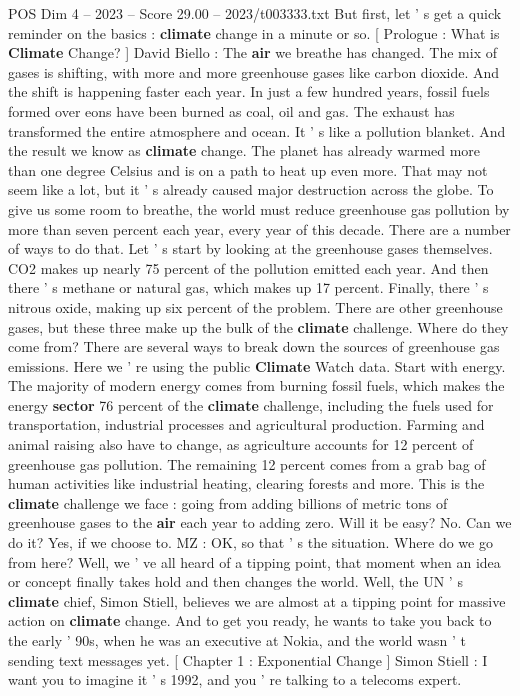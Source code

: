 \begin{textsample}{POS Dim 4 – 2023 – Score 29.00 – 2023/t003333.txt}
But first, let ' s get a quick reminder on the basics : \textbf{climate} change in a minute or so. [ Prologue : What is \textbf{Climate} Change? ] David Biello : The \textbf{air} we breathe has changed.
The mix of gases is shifting, with more and more greenhouse gases like carbon dioxide.
And the shift is happening faster each year.
In just a few hundred years, fossil fuels formed over eons have been burned as coal, oil and gas.
The exhaust has transformed the entire atmosphere and ocean.
It ' s like a pollution blanket.
And the result we know as \textbf{climate} change.
The planet has already warmed more than one degree Celsius and is on a path to heat up even more.
That may not seem like a lot, but it ' s already caused major destruction across the globe.
To give us some room to breathe, the world must reduce greenhouse gas pollution by more than seven percent each year, every year of this decade.
There are a number of ways to do that.
Let ' s start by looking at the greenhouse gases themselves.
CO2 makes up nearly 75 percent of the pollution emitted each year.
And then there ' s methane or natural gas, which makes up 17 percent.
Finally, there ' s nitrous oxide, making up six percent of the problem.
There are other greenhouse gases, but these three make up the bulk of the \textbf{climate} challenge.
Where do they come from?
There are several ways to break down the sources of greenhouse gas emissions.
Here we ' re using the public \textbf{Climate} Watch data.
Start with energy.
The majority of modern energy comes from burning fossil fuels, which makes the energy \textbf{sector} 76 percent of the \textbf{climate} challenge, including the fuels used for transportation, industrial processes and agricultural production.
Farming and animal raising also have to change, as agriculture accounts for 12 percent of greenhouse gas pollution.
The remaining 12 percent comes from a grab bag of human activities like industrial heating, clearing forests and more.
This is the \textbf{climate} challenge we face : going from adding billions of metric tons of greenhouse gases to the \textbf{air} each year to adding zero.
Will it be easy?
No.
Can we do it?
Yes, if we choose to.
MZ : OK, so that ' s the situation.
Where do we go from here?
Well, we ' ve all heard of a tipping point, that moment when an idea or concept finally takes hold and then changes the world.
Well, the UN ' s \textbf{climate} chief, Simon Stiell, believes we are almost at a tipping point for massive action on \textbf{climate} change.
And to get you ready, he wants to take you back to the early ' 90s, when he was an executive at Nokia, and the world wasn ' t sending text messages yet. [ Chapter 1 : Exponential Change ] Simon Stiell : I want you to imagine it ' s 1992, and you ' re talking to a telecoms expert.

\end{textsample}
